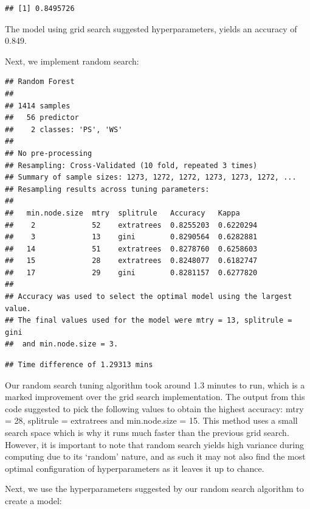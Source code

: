 \documentclass[12pt]{article}
\begin{document}
\begin{verbatim}
## [1] 0.8495726
\end{verbatim}

The model using grid search suggested hyperparameters, yields an
accuracy of 0.849.

Next, we implement random search:

\begin{verbatim}
## Random Forest 
## 
## 1414 samples
##   56 predictor
##    2 classes: 'PS', 'WS' 
## 
## No pre-processing
## Resampling: Cross-Validated (10 fold, repeated 3 times) 
## Summary of sample sizes: 1273, 1272, 1272, 1273, 1273, 1272, ... 
## Resampling results across tuning parameters:
## 
##   min.node.size  mtry  splitrule   Accuracy   Kappa    
##    2             52    extratrees  0.8255203  0.6220294
##    3             13    gini        0.8290564  0.6282881
##   14             51    extratrees  0.8278760  0.6258603
##   15             28    extratrees  0.8248077  0.6182747
##   17             29    gini        0.8281157  0.6277820
## 
## Accuracy was used to select the optimal model using the largest value.
## The final values used for the model were mtry = 13, splitrule = gini
##  and min.node.size = 3.
\end{verbatim}

\begin{verbatim}
## Time difference of 1.29313 mins
\end{verbatim}

Our random search tuning algorithm took around 1.3 minutes to run, which
is a marked improvement over the grid search implementation. The output
from this code suggested to pick the following values to obtain the
highest accuracy: mtry = 28, splitrule = extratrees and min.node.size =
15. This method uses a small search space which is why it runs much
faster than the previous grid search. However, it is important to note
that random search yields high variance during computing due to its
`random' nature, and as such it may not also find the most optimal
configuration of hyperparameters as it leaves it up to chance.

Next, we use the hyperparameters suggested by our random search
algorithm to create a model:
\end{document}

